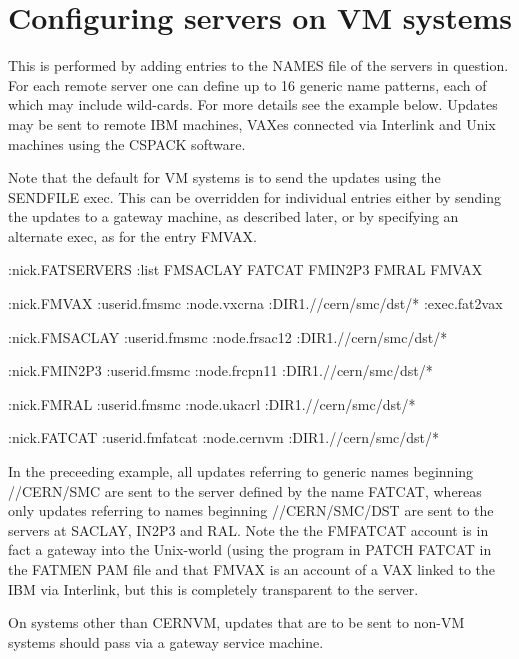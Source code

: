 \section{Configuring servers on VM systems}
\par
This is performed by adding entries to the NAMES file
of the servers in question. For each remote server
one can define up to 16 generic name patterns, each
of which may include wild-cards. For more details
see the example below. Updates may be sent to
remote IBM machines, VAXes connected via Interlink
and Unix machines using the CSPACK software. 
\par
Note that the default for VM systems is to send
the updates using the SENDFILE exec. This can be
overridden for individual entries either by sending
the updates to a gateway machine, as described later,
or by specifying an alternate exec, as for the entry
FMVAX.
\begin{XMP}
:nick.FATSERVERS
               :list FMSACLAY FATCAT FMIN2P3 FMRAL FMVAX

:nick.FMVAX
               :userid.fmsmc
               :node.vxcrna
               :DIR1.//cern/smc/dst/*
               :exec.fat2vax

:nick.FMSACLAY
               :userid.fmsmc
               :node.frsac12
               :DIR1.//cern/smc/dst/*
 
:nick.FMIN2P3
               :userid.fmsmc
               :node.frcpn11
               :DIR1.//cern/smc/dst/*
 
:nick.FMRAL
               :userid.fmsmc
               :node.ukacrl
               :DIR1.//cern/smc/dst/*
 
:nick.FATCAT
               :userid.fmfatcat
               :node.cernvm
               :DIR1.//cern/smc/dst/*
 
\end{XMP}
\par
In the preceeding example, all updates referring to generic
names beginning //CERN/SMC are sent to the server defined
by the name FATCAT, whereas only updates referring to
names beginning //CERN/SMC/DST are sent to the
servers at SACLAY, IN2P3 and RAL.
Note the the FMFATCAT account is in fact a gateway
into the Unix-world (using the program in PATCH FATCAT
in the FATMEN PAM file and that FMVAX is an account of
a VAX linked to the IBM via Interlink, but this is completely
transparent to the server.
\par
On systems other than CERNVM, updates that are to be sent to
non-VM systems should pass via a gateway service machine.
